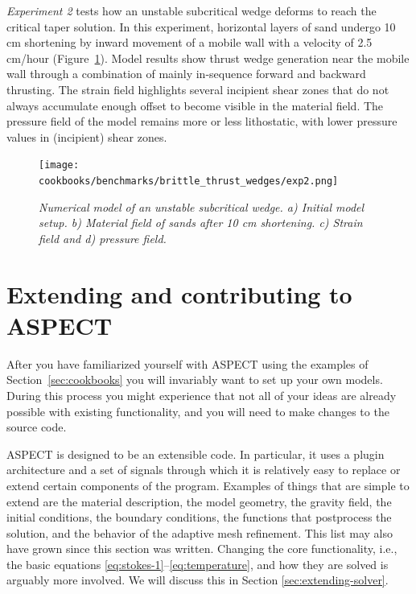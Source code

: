 \documentclass{article}
\newcommand{\aspect}{\textsc{ASPECT}}
\begin{document}
\textit{Experiment 2} tests how an unstable subcritical wedge deforms to reach the 
critical taper solution. In this experiment, horizontal layers of sand undergo 10 cm 
shortening by inward movement of a mobile wall with a velocity of 2.5 cm/hour 
(Figure~\ref{fig:btwexp2}). Model results show thrust wedge generation near the 
mobile wall through a combination of mainly in-sequence forward and backward thrusting. 
The strain field highlights several incipient shear zones that do not always accumulate 
enough offset to become visible in the material field. The pressure field of the model 
remains more or less lithostatic, with lower pressure values in (incipient) shear zones.

\begin{figure}
\begin{center}
  \centering
  \texttt{[image: cookbooks/benchmarks/brittle\_thrust\_wedges/exp2.png]}
  \caption{\it Numerical model of an unstable subcritical wedge. a) Initial model setup. b) Material field of sands after 10 cm shortening. c) Strain field and d) pressure field.}
  \label{fig:btwexp2}
\end{center}
\end{figure}


\section{Extending and contributing to \aspect}
\label{sec:extending}

After you have familiarized yourself with \aspect{} using the examples of
Section~\ref{sec:cookbooks} you will invariably want to set up your own models.
During this process you might experience that not all of your ideas are already possible
with existing functionality, and you will need to make changes to the source code.

\aspect{} is designed to be an extensible code. In particular, it
uses a plugin architecture and a set of signals through which it is
relatively easy to replace or extend certain components of the program. Examples of
things that are simple to extend are the material description, the model geometry,
the gravity field, the initial conditions, the boundary conditions,
the functions that postprocess the solution, and the behavior of the adaptive mesh refinement.
This list may also have grown since this section was written. Changing the core functionality, i.e., the basic equations
\eqref{eq:stokes-1}--\eqref{eq:temperature}, and how they are solved is
arguably more involved. We will discuss this in Section
\ref{sec:extending-solver}.
\end{document}
